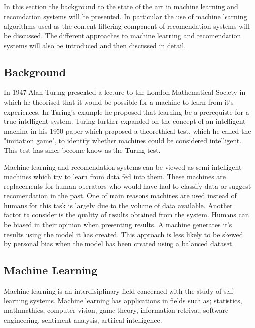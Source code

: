 \chapter{}

In this section the background to the state of the art in machine learning and recomdation systems will be presented.
In particular the use of machine learning algorithms used as the content filtering component of recomendation systems will be discussed.
The different approaches to machine learning and recomendation systems will also be introduced and then discussed in detail.

\section{Background}
In 1947 Alan Turing presented a lecture to the London Mathematical Society in which he theorised that it would be possible for a machine to learn from it's experiences.
In Turing's example he proposed that learning be a prerequiste for a true intelligent system.
Turing further expanded on the concept of an intelligent machine in his 1950 paper which proposed a theorethical test, which he called the "imitation game", to identify whether machines could be considered intelligent.
This test has since become know as the Turing test.

Machine learning and recomendation systems can be viewed as semi-intelligent machines which try to learn from data fed into them.
These machines are replacements for human operators who would have had to classify data or suggest recomendation in the past.
One of main reasons machines are used instead of humans for this task is largely due to the volume of data available.
Another factor to consider is the quality of results obtained from the system.
Humans can be biased in their opinion when presenting results.
A machine generates it's results using the model it has created.
This approach is less likely to be skewed by personal bias when the model has been created using a balanced dataset.

\section{Machine Learning}
Machine learning is an interdisiplinary field concerned with the study of self learning systems.
Machine learning has applications in fields such as; statistics, mathmathics, computer vision, game theory, information retrival, software engineering, sentiment analysis, artifical intelligence.

